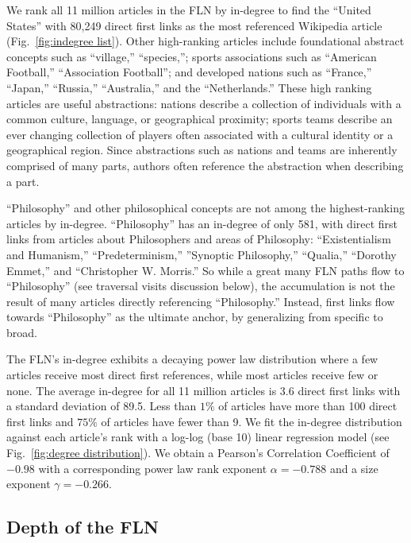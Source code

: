 We rank all 11 million articles in the FLN by in-degree to find 
the ``United States'' with 80,249 direct first links as the most referenced
Wikipedia article 
(Fig.~\ref{fig:indegree list}). 
Other high-ranking articles
include foundational abstract concepts such as ``village,'' ``species,''; 
sports associations such as ``American Football,'' ``Association Football''; 
and developed nations such as ``France,'' ``Japan,'' ``Russia,'' ``Australia,'' and 
the ``Netherlands.'' These high ranking articles are useful abstractions: nations
describe a collection of individuals with a common culture, language, or 
geographical proximity; sports teams describe an ever changing collection of 
players often associated with a cultural identity or a geographical 
region. 
Since abstractions such as nations and teams are inherently comprised
of many parts, authors often reference the abstraction when describing a part.

``Philosophy'' and other philosophical concepts
are not among the highest-ranking articles by in-degree.
``Philosophy'' has an in-degree of only 581, with direct first links from articles about Philosophers and areas of Philosophy: ``Existentialism and Humanism,'' ``Predeterminism,'' ''Synoptic Philosophy,'' ``Qualia,'' ``Dorothy Emmet,'' and ``Christopher W. Morris.''
So while a great many FLN paths flow to 
``Philosophy'' (see traversal visits discussion below), 
the accumulation is not the 
result of many articles directly referencing ``Philosophy.'' 
Instead, first links flow towards ``Philosophy'' as the 
ultimate anchor, by generalizing from specific to broad.


The FLN's in-degree exhibits a decaying power law distribution where a few articles 
receive most direct first references, while most articles receive few or none.
The average in-degree for all 11 million articles is 3.6 direct first links with a standard deviation of 89.5.
Less than $1\%$ of articles have more than 100 direct first links and $75\%$ of articles
have fewer than 9. 
We fit the in-degree distribution against each article's rank with a log-log (base 10) linear regression model
(see Fig.~\ref{fig:degree distribution}).
We obtain a Pearson's Correlation Coefficient of $-0.98$
with a corresponding  power law rank exponent $\alpha = -0.788$ and a size exponent $\gamma = -0.266$. 


\subsection{Depth of the FLN}

